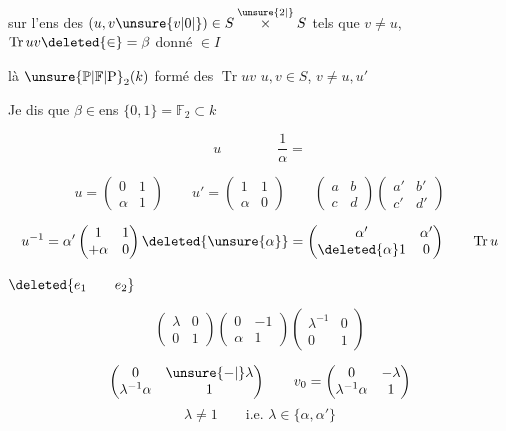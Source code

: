 sur l'ens des $(u,v\unsure{v|0|{} })\in S\overset{\unsure{2|{}}}{\times}S$ tels que $v\ne u$, $\operatorname{Tr}uv\deleted{\in}=\beta$ donné $\in I$

là  $\unsure{\mathbb P|\mathbb F|\mathrm P}_2(k)$  formé des $\operatorname{Tr}uv$  $u,v\in S$, $v\ne u,u'$

Je dis que $\beta\in$\qquad ens  $\{0,1\}=\mathbb F_2\subset k$

\[
u\qquad\qquad \frac{1}{\alpha}=
\]

\[
u=\begin{pmatrix}0&1\\\alpha&1\end{pmatrix}\qquad
u'=\begin{pmatrix}1&1\\\alpha&0\end{pmatrix}
\qquad
\begin{pmatrix}a&b\\c&d\end{pmatrix}\begin{pmatrix}a'&b'\\c'&d'\end{pmatrix}
\]

\[
u^{-1}=\alpha'\begin{pmatrix}1&1\\+\alpha&0\end{pmatrix}\deleted{\unsure{\alpha}}
=\begin{pmatrix}\alpha'&\alpha'\\\deleted{\alpha}1&0\end{pmatrix}\qquad\operatorname{Tr}u
\]

$\deleted{e_1\qquad e_2}$

\[
\begin{pmatrix}\lambda&0\\0&1\end{pmatrix}
\begin{pmatrix}0&-1\\\alpha&1\end{pmatrix}
\begin{pmatrix}\lambda^{-1}&0\\0&1\end{pmatrix}
\]

\[
\begin{pmatrix}0&\unsure{-|{}}\lambda\\\lambda^{-1}\alpha&1\end{pmatrix}
\qquad v_0=\begin{pmatrix}0&-\lambda\\\lambda^{-1}\alpha&1\end{pmatrix}
\]
\[
\lambda\ne1\qquad\text{i.e. }\lambda\in\{\alpha,\alpha'\}
\]

